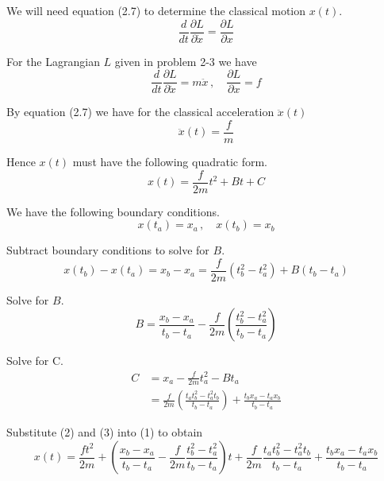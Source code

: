 


We will need equation (2.7) to determine the classical motion $x(t)$.
\begin{equation*}
\frac{d}{dt}\frac{\partial L}{\partial\dot x}=\frac{\partial L}{\partial x}
\tag{2.7}
\end{equation*}

For the Lagrangian $L$ given in problem 2-3 we have
\begin{equation*}
\frac{d}{dt}\frac{\partial L}{\partial\dot x}=m\ddot x\,, %
\quad
\frac{\partial L}{\partial x}=f
\end{equation*}

By equation (2.7) we have for the classical acceleration $\ddot x(t)$
\begin{equation*}
\ddot x(t)=\frac{f}{m}
\end{equation*}

Hence $x(t)$ must have the following quadratic form.
\begin{equation*}
x(t)=\frac{f}{2m}t^2+Bt+C
\tag{1}
\end{equation*}

We have the following boundary conditions.
\begin{equation*}
x(t_a)=x_a\,, %
\quad
x(t_b)=x_b
\end{equation*}

Subtract boundary conditions to solve for $B$.
\begin{equation*}
x(t_b)-x(t_a)
=x_b-x_a
=\frac{f}{2m}\left(t_b^2-t_a^2\right)+B(t_b-t_a)
\end{equation*}

Solve for $B$.
\begin{equation*}
B=\frac{x_b-x_a}{t_b-t_a}-\frac{f}{2m}\left(\frac{t_b^2-t_a^2}{t_b-t_a}\right)
\tag{2}
\end{equation*}

Solve for C.
\begin{align*}
C&=x_a-\frac{f}{2m}t_a^2-Bt_a
\\[1ex]
&=\frac{f}{2m}\left(\frac{t_a t_b^2 - t_a^2 t_b}{t_b - t_a}\right) + \frac{t_b x_a - t_a x_b}{t_b - t_a}
\tag{3}
\end{align*}

Substitute (2) and (3) into (1) to obtain
\begin{equation*}
x(t)=
\frac{ft^2}{2m}
+\left(\frac{x_b-x_a}{t_b-t_a}-\frac{f}{2m}\frac{t_b^2-t_a^2}{t_b-t_a}\right)t
+\frac{f}{2m}\frac{t_a t_b^2 - t_a^2 t_b}{t_b - t_a} + \frac{t_b x_a - t_a x_b}{t_b - t_a}
\tag{4}
\end{equation*}

